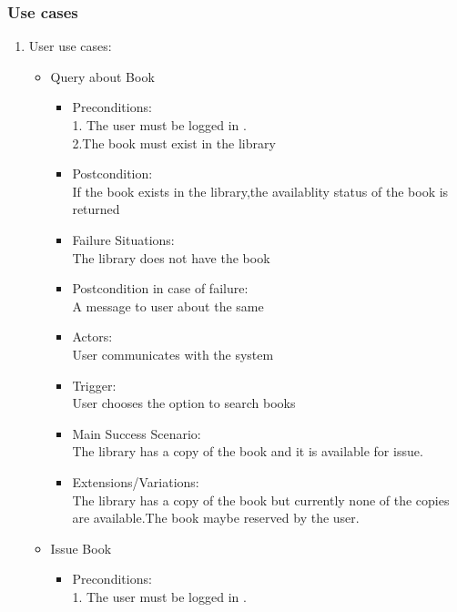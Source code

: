 \documentclass{article}
\begin{document}
\subsubsection*{Use cases}
\begin{enumerate}
\item User use cases:
	\begin{itemize}
	
	\item Query about Book\\
	\begin{itemize}
	\item Preconditions:\\
	1. The user must be logged in .\\
	2.The book must exist in the library\\
\item  Postcondition: \\If the book exists in the library,the availablity status of the book is returned\\
 \item Failure Situations:\\ The library does not have  the book \\
 \item Postcondition in case of failure:\\A message to user about the same\\
\item  Actors:\\ User communicates with the system\\
\item  Trigger:\\ User chooses the option to search books\\
 \item Main Success Scenario: \\The library has a copy of the book and it is available for issue.\\
\item  Extensions/Variations: \\The library has a copy of the book but currently none of the copies are available.The book maybe reserved by the user.
	\end{itemize}
 \item Issue Book\\
	\begin{itemize}
	 \item Preconditions:\\
	 1. The user must be logged in .\\

\end{itemize}
\end{itemize}
\end{enumerate}
\end{document}
